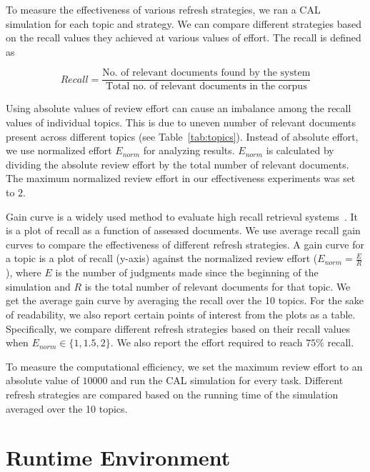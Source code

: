 To measure the effectiveness of various refresh strategies, we ran a CAL simulation for
each topic and strategy. We can compare different strategies based on the recall
values they achieved at various values of effort. The recall is
defined as

\begin{equation}
    Recall = \frac{\text{No. of relevant documents found by the system}}{\text{Total no. of
    relevant documents in the corpus}}
\end{equation}

Using absolute values of review effort can cause an imbalance among the recall
values of individual topics. This is due to uneven number of relevant documents
present across different topics (see Table~\ref{tab:topics}). Instead of
absolute effort, we use normalized effort $E_{norm}$ for analyzing results.
$E_{norm}$ is calculated by dividing the absolute review effort by the total
number of relevant documents. The maximum normalized review effort in our
effectiveness experiments was set to $2$.

Gain curve is a widely used method to evaluate high recall retrieval
systems~\cite{roegiest2015trec,grossman2016trec,grossman2011overview}. It is a
plot of recall as a function of assessed documents. We use average recall gain
curves to compare the effectiveness of different refresh strategies.  A gain
curve for a topic is a plot of recall (y-axis) against the normalized review
effort ($E_{norm} = \frac{E}{R}$), where $E$ is the number of judgments made
since the beginning of the simulation and $R$ is the total number of relevant
documents for that topic. We get the average gain curve by averaging the recall
over the 10 topics. For the sake of readability, we also report certain points
of interest from the plots as a table. Specifically, we compare different
refresh strategies based on their recall values when $E_{norm} \in \{1,1.5,2\}$.
We also report the effort required to reach $75\%$ recall.

To measure the computational efficiency, we set the maximum review effort to an
absolute value of $10000$ and run the CAL simulation for every task. Different
refresh strategies are compared based on the running time of the simulation
averaged over the 10 topics.


\section{Runtime Environment}

